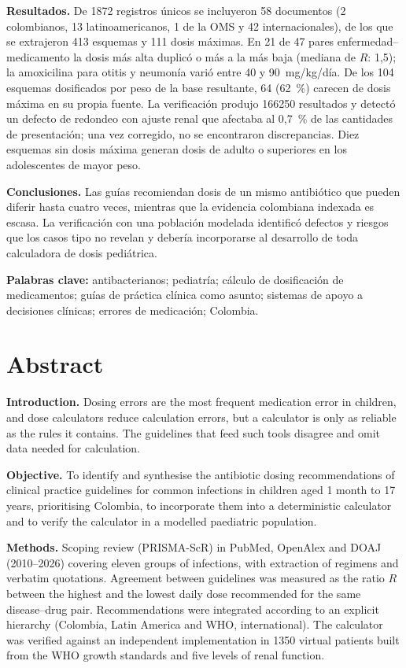 \documentclass[11pt,a4paper]{article}
\begin{document}
\noindent\textbf{Resultados.} De \num{1872} registros únicos se incluyeron 58 documentos (2 colombianos, 13 latinoamericanos, 1 de la OMS y 42 internacionales), de los que se extrajeron 413 esquemas y 111 dosis máximas. En 21 de 47 pares enfermedad--medicamento la dosis más alta duplicó o más a la más baja (mediana de $R$: 1,5); la amoxicilina para otitis y neumonía varió entre 40 y 90~mg/kg/día. De los 104 esquemas dosificados por peso de la base resultante, 64 (62~\%) carecen de dosis máxima en su propia fuente. La verificación produjo \num{166250} resultados y detectó un defecto de redondeo con ajuste renal que afectaba al 0,7~\% de las cantidades de presentación; una vez corregido, no se encontraron discrepancias. Diez esquemas sin dosis máxima generan dosis de adulto o superiores en los adolescentes de mayor peso.

\noindent\textbf{Conclusiones.} Las guías recomiendan dosis de un mismo antibiótico que pueden diferir hasta cuatro veces, mientras que la evidencia colombiana indexada es escasa. La verificación con una población modelada identificó defectos y riesgos que los casos tipo no revelan y debería incorporarse al desarrollo de toda calculadora de dosis pediátrica.

\noindent\textbf{Palabras clave:} antibacterianos; pediatría; cálculo de dosificación de medicamentos; guías de práctica clínica como asunto; sistemas de apoyo a decisiones clínicas; errores de medicación; Colombia.

\section{Abstract}

\noindent\textbf{Introduction.} Dosing errors are the most frequent medication error in children, and dose calculators reduce calculation errors, but a calculator is only as reliable as the rules it contains. The guidelines that feed such tools disagree and omit data needed for calculation.

\noindent\textbf{Objective.} To identify and synthesise the antibiotic dosing recommendations of clinical practice guidelines for common infections in children aged 1 month to 17 years, prioritising Colombia, to incorporate them into a deterministic calculator and to verify the calculator in a modelled paediatric population.

\noindent\textbf{Methods.} Scoping review (PRISMA-ScR) in PubMed, OpenAlex and DOAJ (2010--2026) covering eleven groups of infections, with extraction of regimens and verbatim quotations. Agreement between guidelines was measured as the ratio $R$ between the highest and the lowest daily dose recommended for the same disease--drug pair. Recommendations were integrated according to an explicit hierarchy (Colombia, Latin America and WHO, international). The calculator was verified against an independent implementation in \num{1350} virtual patients built from the WHO growth standards and five levels of renal function.
\end{document}
